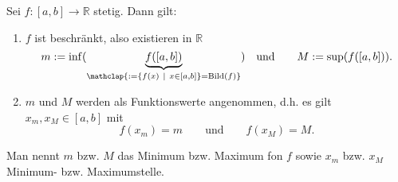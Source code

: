 Sei $f: [a, b] \to \mathbb{R}$ stetig. Dann gilt:
\begin{enumerate}
    \item $f$ ist beschränkt, also existieren in $\mathbb{R}$ 
    $$m := \inf(\underbrace{f([a, b])}_{\mathclap{:= \{f(x) \ | \ x \in [a, b]\} = \text{Bild}(f)}}) \quad \text{und} \qquad M := \sup(f([a, b])).$$
    \item $m$ und $M$ werden als Funktionswerte angenommen, d.h. es gilt $x_m, x_M \in [a, b]$ mit
    $$f(x_m) = m \qquad \text{und} \qquad f(x_M) = M.$$
\end{enumerate}
Man nennt $m$ bzw. $M$ das Minimum bzw. Maximum fon $f$ sowie $x_m$ bzw. $x_M$ Minimum- bzw. Maximumstelle.